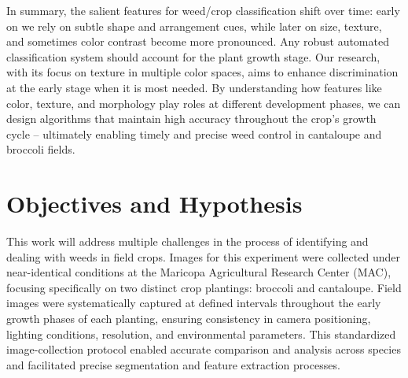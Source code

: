 \documentclass[letterpaper, notitlepage]{report}
\begin{document}
In summary, the salient features for weed/crop classification shift over time: early on we rely on subtle shape and arrangement cues, while later on size, texture, and sometimes color contrast become more pronounced. Any robust automated classification system should account for the plant growth stage. Our research, with its focus on texture in multiple color spaces, aims to enhance discrimination at the early stage when it is most needed. By understanding how features like color, texture, and morphology play roles at different development phases, we can design algorithms that maintain high accuracy throughout the crop’s growth cycle – ultimately enabling timely and precise weed control in cantaloupe and broccoli fields. 

\section{Objectives and Hypothesis}
This work will address multiple challenges in the process of identifying and dealing with weeds in field crops. Images for this experiment were collected under near-identical conditions at the Maricopa Agricultural Research Center (MAC), focusing specifically on two distinct crop plantings: broccoli and cantaloupe. Field images were systematically captured at defined intervals throughout the early growth phases of each planting, ensuring consistency in camera positioning, lighting conditions, resolution, and environmental parameters. This standardized image-collection protocol enabled accurate comparison and analysis across species and facilitated precise segmentation and feature extraction processes.
\end{document}

